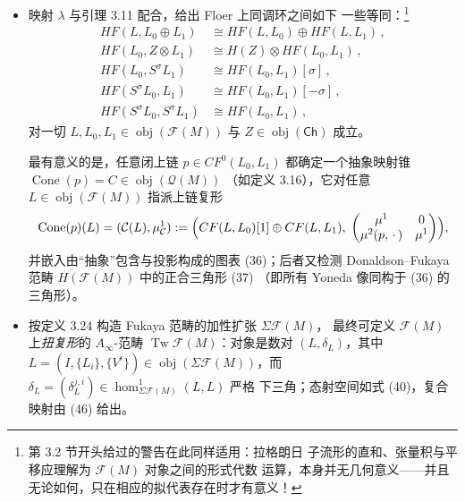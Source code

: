 \begin{itemize}
  于是可以定义 Yoneda 嵌入
  \[
  \Upsilon\equiv\Upsilon_{\mathcal F(M)}:\mathcal F(M)\to\mathcal Q(M)\,,
  \]
  它在上同调意义下全且忠实，由
  $\Upsilon(L)(\tilde L):=CF(\tilde L,L)$ 与
  $\mu^d_{\Upsilon(L)}:=\mu^d:CF(L_{d-1},L)\otimes\cdots\otimes
  CF(L_0,L_1)\to CF(L_0,L)$ 给出，如 \eqref{eq:6.84}（由定义 2.35）。
  对任意 $\mathcal M\in\operatorname{obj}(\mathcal Q(M))$ 与
  $L\in\operatorname{obj}(\mathcal F(M))$，Yoneda 引理 2.36 使下述
  $\Upsilon^1(p)^d$ 的延拓
  \[
  \lambda_{\mathcal M}:\mathcal M(L)\to
  \hom_{\mathcal Q(M)}\bigl(\Upsilon(L),\mathcal M(L)\bigr)
  \]
  成为拟同构（其中 $p\in CF(\tilde L,L)$）：
  \[
  \Upsilon^1(p)^d:CF(L_{d-1},\tilde L)\otimes CF(L_{d-2},L_{d-1})
  \otimes\cdots\otimes CF(L_0,L_1)\to CF(L_0,L),
  \]
  \[
  (\tilde p,p_{d-1},\dots,p_1)\mapsto
  \mu^{d+1}(p,\tilde p,p_{d-1},\dots,p_1)\,.
  \]
  \item 映射 $\lambda$ 与引理 3.11 配合，给出 Floer 上同调环之间如下
  一些等同：\footnote{第 3.2 节开头给过的警告在此同样适用：拉格朗日
  子流形的直和、张量积与平移应理解为 $\mathcal F(M)$ 对象之间的形式代数
  运算，本身并无几何意义——并且无论如何，只在相应的拟代表存在时才有意义！}
  \[
  \begin{aligned}
  HF(L,L_0\oplus L_1)&\cong HF(L,L_0)\oplus HF(L,L_1)\,,\\
  HF(L_0,Z\otimes L_1)&\cong H(Z)\otimes HF(L_0,L_1)\,,\\
  HF(L_0,S^\sigma L_1)&\cong HF(L_0,L_1)[\sigma]\,,\\
  HF(S^\sigma L_0,L_1)&\cong HF(L_0,L_1)[-\sigma]\,,\\
  HF(S^\sigma L_0,S^\sigma L_1)&\cong HF(L_0,L_1)\,,
  \end{aligned}
  \]
  对一切 $L,L_0,L_1\in\operatorname{obj}(\mathcal F(M))$ 与
  $Z\in\operatorname{obj}(\mathsf{Ch})$ 成立。

  最有意义的是，任意闭上链 $p\in CF^0(L_0,L_1)$ 都确定一个抽象映射锥
  $\operatorname{Cone}(p)=C\in\operatorname{obj}(\mathcal Q(M))$
  （如定义 3.16），它对任意 $L\in\operatorname{obj}(\mathcal F(M))$
  指派上链复形
  \[
  \operatorname{Cone}(p)(L)=(\mathcal C(L),\mu^1_{\mathcal C})
  :=\Bigl(CF(L,L_0)[1]\oplus CF(L,L_1),\;
  \begin{pmatrix}\mu^1&0\\ \mu^2(p,\,\cdot\,)&\mu^1\end{pmatrix}\Bigr),
  \]
  并嵌入由“抽象”包含与投影构成的图表 (36)；后者又检测
  Donaldson--Fukaya 范畴 $H(\mathcal F(M))$ 中的正合三角形 (37)
  （即所有 Yoneda 像同构于 (36) 的三角形）。
  \item 按定义 3.24 构造 Fukaya 范畴的加性扩张 $\Sigma\mathcal F(M)$，
  最终可定义 $\mathcal F(M)$ 上\emph{扭复形}的 $A_\infty$-范畴
  $\operatorname{Tw}\mathcal F(M)$：对象是数对 $(L,\delta_L)$，其中
  $L=(I,\{L_i\},\{V^i\})\in\operatorname{obj}(\Sigma\mathcal F(M))$，而
  $\delta_L=(\delta^{j,i}_L)\in\hom^1_{\Sigma\mathcal F(M)}(L,L)$ 严格
  下三角；态射空间如式 (40)，复合映射由 (46) 给出。


\end{itemize}
